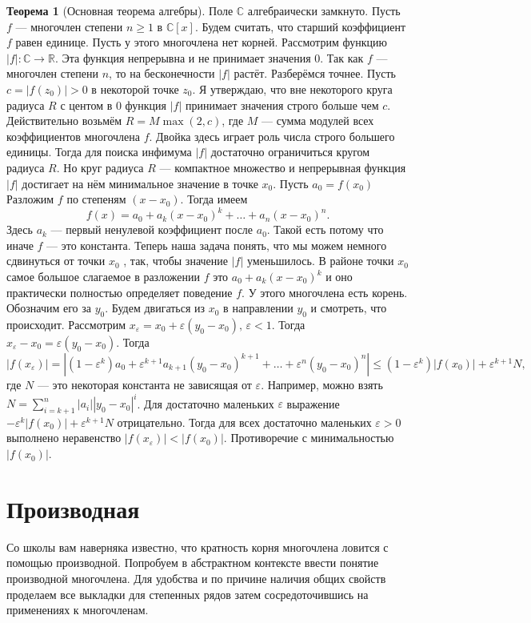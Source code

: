 \documentclass[10pt,a4paper,oneside]{book} %
\theoremstyle{definition}
\newtheorem*{thmm}{Теорема}
\newcommand{\mb}[1]{\mathbb{#1}}
\def\eps{\varepsilon}
\begin{document}
\begin{thmm}[Основная теорема алгебры] Поле $\mb C$ алгебраически замкнуто.
\proof Пусть $f$ — многочлен степени $n\geq 1$ в $\mb C[x]$. Будем считать, что старший коэффициент $f$ равен единице. Пусть у этого многочлена нет корней. Рассмотрим функцию $|f|\colon \mb C \to \mb R$. Эта функция непрерывна и не принимает значения 0. Так как $f$ --- многочлен степени $n$, то на бесконечности $|f|$ растёт. Разберёмся точнее. Пусть
$c = |f(z_0)| > 0$ в некоторой точке $z_0$. Я утверждаю, что вне некоторого круга радиуса $R$ с центом в 0 функция
$|f|$ принимает значения строго больше чем $c$. Действительно возьмём $R= M \max(2,c)$, где $M$ --- сумма модулей всех коэффициентов многочлена $f$. Двойка здесь играет роль числа строго большего единицы.
Тогда для поиска инфимума $|f|$ достаточно ограничиться кругом радиуса $R$. Но круг радиуса $R$ --- компактное множество и непрерывная функция $|f|$ достигает на нём минимальное значение в точке $x_0$. Пусть $a_0 =f(x_0)$ Разложим
$f$ по степеням $(x-x_0)$. Тогда имеем
$$f(x) = a_0 + a_k (x-x_0)^k + \dots + a_n(x -x_0 )^n.$$
Здесь $a_k$ --- первый ненулевой коэффициент после $a_0$. Такой есть потому что иначе $f$ --- это константа. Теперь наша
задача понять, что мы можем немного сдвинуться от точки $x_0$ , так, чтобы значение $|f|$ уменьшилось. В районе точки
$x_0$ самое большое слагаемое в разложении $f$ это $a_0 + a_k (x-x_0)^k$ и оно практически полностью определяет поведение $f$.
У этого многочлена есть корень. Обозначим его за $y_0$. Будем двигаться из $x_0$ в направлении $y_0$ и смотреть, что происходит.
Рассмотрим $x_{\eps} = x_0 + \eps(y_0 -x_0 ), \,\eps < 1$. Тогда $x_{\eps} -x_0 = \eps(y_0 -x_0 )$. Тогда
$$|f(x_{\eps})| = |(1 - \eps^k)a_0 + \eps^{k+1} a_{k+1} (y_0 -x_0)^{k+1} + \dots+ \eps^n(y_0-x_0 )^n | \leq (1- \eps^k )|f(x_0)| + \eps^{k+1}N,$$
где $N$ — это некоторая константа не зависящая от $\eps$. Например, можно взять $N = \sum_{i=k+1}^n |a_i||y_0 -x_0 |^i$. Для достаточно
маленьких $\eps$ выражение $ -\eps^k |f(x_0)| + \eps^{k+1}N$ отрицательно. Тогда для всех достаточно маленьких $\eps>0$ выполнено неравенство $|f(x_{\eps})| < |f(x_0)|$.
Противоречие с минимальностью $|f(x_0)|$. \endproof
\end{thmm}






\section{Производная}
Со школы вам наверняка известно, что кратность корня многочлена ловится с помощью производной. Попробуем в абстрактном
контексте ввести понятие производной многочлена. Для удобства и по причине наличия общих свойств проделаем все выкладки для степенных рядов затем сосредоточившись на применениях к многочленам.
\end{document}
